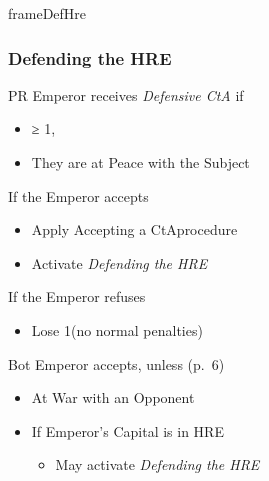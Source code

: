 \documentclass[10pt]{article}
\newlength{\fhDefHre} \setlength\fhDefHre{15\baselineskip}
\begin{document}
\begin{dynamiccontents*}{frameDefHre}\begin{eubox}{\fhDefHre}
	\subsubsection*{Defending the HRE }
	\begin{itemize}
		\item PR Emperor receives \emph{Defensive CtA} if 
		\begin{itemize}
			\item \authority ≥ 1, 
			\item They are at Peace with the Subject
		\end{itemize}
		\item If the Emperor accepts
		\begin{itemize}
			\item Apply \dprime Accepting a CtA\dprime procedure
			\item {}Activate \emph{Defending the HRE}
		\end{itemize}
		\item If the Emperor refuses
		\begin{itemize}
			\item Lose 1\authority (no normal penalties)
		\end{itemize}
		{\botrules
		\item Bot Emperor accepts, unless (p.~6)
		\begin{itemize}
			\item At War with an Opponent
		\end{itemize}
		}
	\end{itemize}
	\begin{itemize}
		\item If Emperor's Capital is in HRE
		\begin{itemize}
			\item {}May activate \emph{Defending the HRE}
		\end{itemize}
	\end{itemize}
\end{eubox}\end{dynamiccontents*}
\end{document}
